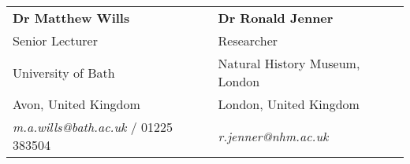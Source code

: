 \documentclass[margin,line]{resume}
\begin{document}
\begin{resume}
\begin{tabular}{@{}p{6cm}p{6cm}}
\textbf{Dr Matthew Wills}              &  \textbf{Dr Ronald Jenner}     \\
Senior Lecturer          &  Researcher      \\
University of Bath                     &  Natural History Museum, London    \\
Avon, United Kingdom           &  London, United Kingdom      \\
\textsl{m.a.wills@bath.ac.uk} / 01225 383504     &   \textsl{r.jenner@nhm.ac.uk}    \\

\end{tabular}


\end{resume}
\end{document}
